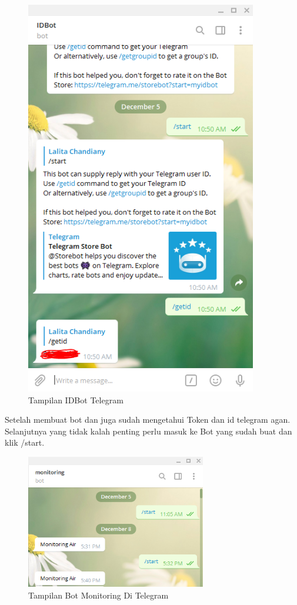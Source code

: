 \begin{enumerate}
\begin{enumerate}
    \begin{figure}[H]
    \centering
    \includegraphics[width=0.9\textwidth]{figures/bot7.png}
    \caption{Tampilan IDBot Telegram}
    \label{print}
    \end{figure}
    \end{enumerate}
    \par Setelah membuat bot dan juga sudah mengetahui Token dan id telegram agan. Selanjutnya yang tidak kalah penting perlu masuk ke Bot yang sudah buat dan klik /start.
    \begin{figure}[H]
    \centering
    \includegraphics[width=0.7\textwidth]{figures/bot8.png}
    \caption{Tampilan Bot Monitoring Di Telegram}
    \label{print}
    \end{figure}
     

\end{enumerate}

